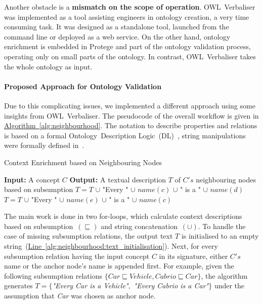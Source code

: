 \documentclass[draft,final]{vutinfth} %
\begin{document}
Another obstacle is a \textbf{mismatch on the scope of operation}. OWL~Verbaliser was implemented as a tool assisting engineers in ontology creation, a very time consuming task. It was designed as a standalone tool, launched from the command line or deployed as a web service. On the other hand, ontology enrichment is embedded in Protege and part of the ontology validation process, operating only on small parts of the ontology. In contrast, OWL~Verbaliser takes the whole ontology as input. 

\paragraph{Proposed Approach for Ontology Validation} Due to this complicating issues, we implemented a different approach using some insights from OWL~Verbaliser. The pseudocode of the overall workflow is given in \hyperref[alg:neighbourhood]{Algorithm~\ref*{alg:neighbourhood}}. The notation to describe properties and relations is based on a formal Ontology~Description Logic~(DL)~\cite{baader2003}, string manipulations were formally defined in~\cite{hopcroft1969}.

\begin{algorithm}
	\caption{Context Enrichment based on Neighbouring Nodes}\label{alg:neighbourhood}
	\begin{algorithmic}[1]
		\newline
			\textbf{Input:} A concept $C$\newline
			\textbf{Output:} A textual description $T$ of $C's$ neighbouring nodes based on subsumption\newline
			 \label{alg:neighbourhood:text_initialisation}
				\State $T=T$ $\cup$ "Every " $\cup$ $name(c)$ $\cup$ " is a " $\cup$ $name(d)$
			\EndFor
				\State $T=T$ $\cup$ "Every " $\cup$ $name(e)$ $\cup$ " is a " $\cup$ $name(c)$
			\EndFor
		\EndProcedure
	\end{algorithmic}
\end{algorithm}

The main work is done in two for-loops, which calculate context descriptions based on subsumption~$(\sqsubseteq)$ and string concatenation~$(\cup)$. To handle the case of missing subsumption relations, the output text $T$ is initialised to an empty string~(\hyperref[alg:neighbourhood:text_initialisation]{Line~\ref*{alg:neighbourhood:text_initialisation}}). Next, for every subsumption relation having the input concept $C$ in its signature, either $C's$ name or the anchor node's name is appended first. For example, given the following subsumption relations $\{Car \sqsubseteq Vehicle, Cabrio \sqsubseteq Car\}$, the algorithm generates $T=\{$\textit{"Every Car is a Vehicle"}$,$ \textit{"Every Cabrio is a Car"}$\}$ under the assumption that \textit{Car} was chosen as anchor node.
\end{document}
